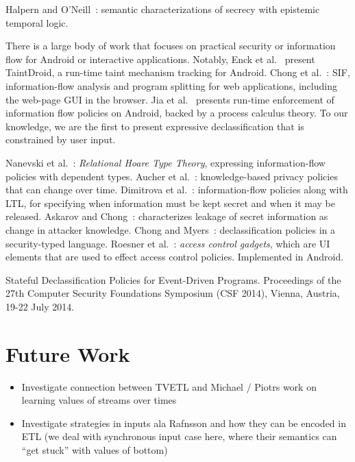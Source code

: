 \documentclass[conference]{IEEEtran}
\theoremstyle{definition}
\newcommand{\comment}[3][\color{red}]{{#1{[{#2}: {#3}]}}}
\newcommand{\kris}[1]{\comment[\color{orange}]{kris}{#1}}
\begin{document}
Halpern and O'Neill~\cite{Halpern:08}: semantic characterizations of
secrecy with epistemic temporal logic.

There is a large body of work that focuses on practical security or
information flow for Android or interactive applications.  Notably,
Enck et al.~\cite{Enck:10} present TaintDroid, a run-time taint
mechanism tracking for Android.  Chong et al.~\cite{Chong:07}: SIF,
information-flow analysis and program splitting for web applications,
including the web-page GUI in the browser. Jia et al.~\cite{Jia:13}
presents run-time enforcement of information flow policies on Android,
backed by a process calculus theory.  To our knowledge, we are the
first to present expressive declassification that is constrained by
user input.

Nanevski et al.~\cite{Nanevski:13}: \emph{Relational Hoare Type
  Theory}, expressing information-flow policies with dependent types.
Aucher et al.~\cite{Aucher:11}: knowledge-based privacy policies that
can change over time. Dimitrova et al.~\cite{Dimitrova:12}:
information-flow policies along with LTL, for specifying when
information must be kept secret and when it may be released. Askarov
and Chong~\cite{Askarov:12}: characterizes leakage of secret
information as change in attacker knowledge. Chong and
Myers~\cite{Chong:04}: declassification policies in a security-typed
language. Roesner et al.~\cite{Roesner:12}: \emph{access control
  gadgets}, which are UI elements that are used to effect access
control policies.  Implemented in Android.

Stateful Declassification Policies for Event-Driven
Programs. Proceedings of the 27th Computer Security Foundations
Symposium (CSF 2014), Vienna, Austria, 19-22 July 2014. \kris{Cite
  this}

\section{Future Work}
\label{sec:future}

\begin{itemize}
  \item Investigate connection between TVETL and Michael / Piotrs work
    on learning values of streams over times
  \item Investigate strategies in inputs ala Rafnsson and how they can
    be encoded in ETL (we deal with synchronous input case here, where
    their semantics can ``get stuck'' with values of bottom)
\end{itemize}
\end{document}
